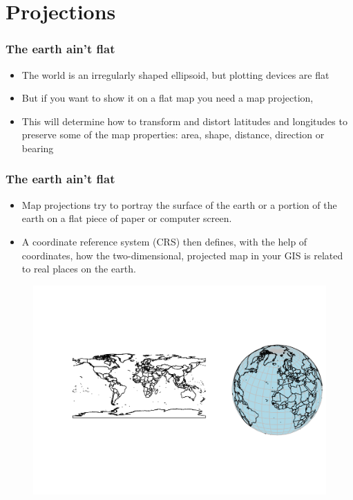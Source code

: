 \documentclass[
  shownotes,
  xcolor={svgnames},
  hyperref={colorlinks,citecolor=DarkBlue,linkcolor=andesred,urlcolor=DarkBlue}
  , aspectratio=169]{beamer}
\begin{document}
\section{Projections}
\begin{frame}[fragile]
\frametitle{The earth ain't flat}
\begin{itemize}
  
  \item The world is an irregularly shaped ellipsoid, but plotting devices are flat
  \medskip
  \item But if you want to show it on a flat map you need a map projection, 
  \medskip
  \item This  will determine how to transform and distort latitudes and longitudes to preserve some of the map properties: area, shape, distance, direction or bearing
\end{itemize}

\end{frame}
\begin{frame}[fragile]
\frametitle{The earth ain't flat}

\begin{itemize}
    \footnotesize
\item Map projections try to portray the surface of the earth or a portion of the earth on a flat piece of paper or computer screen. 
\medskip
\item A coordinate reference system (CRS) then defines, with the help of coordinates, how the two-dimensional, projected map in your GIS is related to real places on the earth. 
\end{itemize}

\begin{figure}[H] \centering
            \captionsetup{justification=centering}
                \includegraphics[scale=0.6]{figures/world-1.png}
 \end{figure}

\end{frame}
\end{document}
